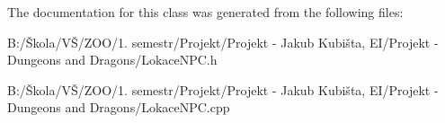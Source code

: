 The documentation for this class was generated from the following files\-:\begin{DoxyCompactItemize}
\item 
B\-:/Škola/\-VŠ/\-Z\-O\-O/1. semestr/\-Projekt/\-Projekt -\/ Jakub Kubišta, E\-I/\-Projekt -\/ Dungeons and Dragons/Lokace\-N\-P\-C.\-h\item 
B\-:/Škola/\-VŠ/\-Z\-O\-O/1. semestr/\-Projekt/\-Projekt -\/ Jakub Kubišta, E\-I/\-Projekt -\/ Dungeons and Dragons/Lokace\-N\-P\-C.\-cpp\end{DoxyCompactItemize}
